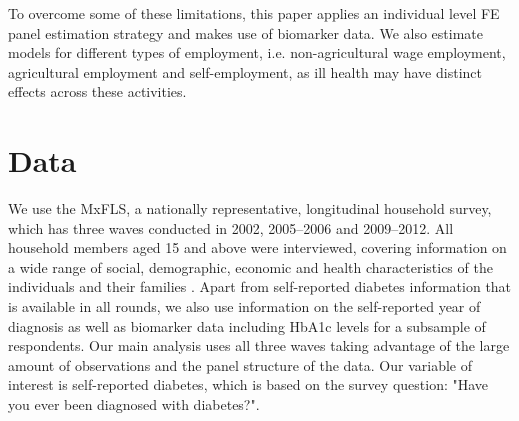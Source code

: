 To overcome some of these limitations, this paper applies an individual level \ac{FE} panel estimation strategy and makes use of biomarker data. We also estimate models for different types of employment, i.e. non-agricultural wage employment, agricultural employment and self-employment, as ill health may have distinct effects across these activities.
\section{\label{sec:Data}Data}

We use the \acf{MxFLS}, a nationally representative, longitudinal household survey, which has three waves conducted in 2002, 2005--2006 and 2009--2012. All household members aged 15 and above were interviewed, covering information on a wide range of social, demographic, economic and health characteristics of the individuals and their families \parencite{Rubalcava2013}. Apart from self-reported diabetes information that is available in all rounds, we also use information on the self-reported year of diagnosis as well as biomarker data including \ac{HbA1c} levels for a subsample of respondents.  Our main analysis uses all three waves taking advantage of the large amount of observations and the panel structure of the data. Our variable of interest is self-reported diabetes, which is based on the survey question: "Have you ever been diagnosed with diabetes?". 

